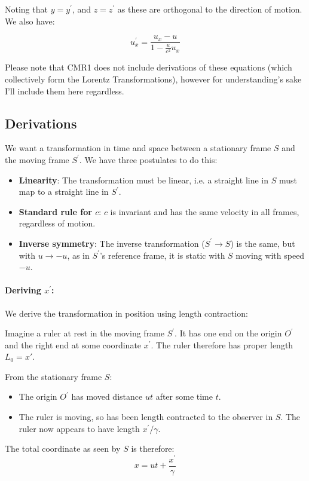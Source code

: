Noting that $y = y^\prime$, and $z = z^\prime$ as these are orthogonal to the direction of motion. We also have:

\[
    u^\prime_x = \frac{u_x - u}{1 - \frac{u}{c^2} u_x}
\]

Please note that CMR1 does not include derivations of these equations (which collectively form the Lorentz Transformations), however for understanding's sake I'll include them here regardless.

\subsection{Derivations}
We want a transformation in time and space between a stationary frame $S$ and the moving frame $S^\prime$. We have three postulates to do this:
\begin{itemize}
    \item \textbf{Linearity}: The transformation must be linear, i.e. a straight line in $S$ must map to a straight line in $S^\prime$.
    \item \textbf{Standard rule for $c$}: $c$ is invariant and has the same velocity in all frames, regardless of motion.
    \item \textbf{Inverse symmetry}: The inverse transformation ($S^\prime \to S$) is the same, but with $u \to -u$, as in $S^\prime$'s reference frame, it is static with $S$ moving with speed $-u$.
\end{itemize}

\paragraph{Deriving $x^\prime$: } We derive the transformation in position using length contraction:

Imagine a ruler at rest in the moving frame $S^\prime$. It has one end on the origin $O^\prime$ and the right end at some coordinate $x^\prime$. The ruler therefore has proper length $L_0 = x'$.

From the stationary frame $S$:
\begin{itemize}
    \item The origin $O^\prime$ has moved distance $ut$ after some time $t$.
    \item The ruler is moving, so has been length contracted to the observer in $S$. The ruler now appears to have length $x^\prime / \gamma$.
\end{itemize}

The total coordinate as seen by $S$ is therefore:
\[
    x = ut + \frac{x^\prime}{\gamma}
\]

